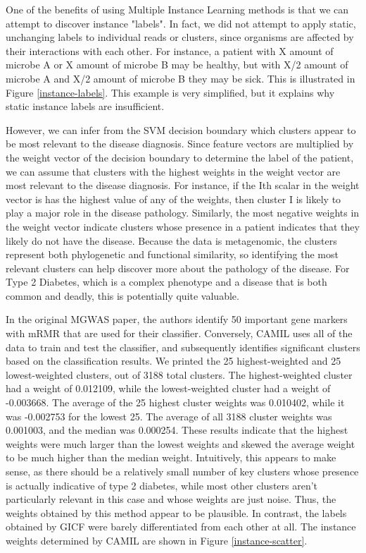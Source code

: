 One of the benefits of using Multiple Instance Learning methods is that we can attempt to discover instance "labels". In fact, we did not attempt to apply static, unchanging labels to individual reads or clusters, since organisms are affected by their interactions with each other. For instance, a patient with X amount of microbe A or X amount of microbe B may be healthy, but with X/2 amount of microbe A and X/2 amount of microbe B they may be sick. This is illustrated in Figure \ref{instance-labels}. This example is very simplified, but it explains why static instance labels are insufficient.

However, we can infer from the SVM decision boundary which clusters appear to be most relevant to the disease diagnosis. Since feature vectors are multiplied by the weight vector of the decision boundary to determine the label of the patient, we can assume that clusters with the highest weights in the weight vector are most relevant to the disease diagnosis. For instance, if the Ith scalar in the weight vector is has the highest value of any of the weights, then cluster I is likely to play a major role in the disease pathology. Similarly, the most negative weights in the weight vector indicate clusters whose presence in a patient indicates that they likely do not have the disease. Because the data is metagenomic, the clusters represent both phylogenetic and functional similarity, so identifying the most relevant clusters can help discover more about the pathology of the disease. For Type 2 Diabetes, which is a complex phenotype and a disease that is both common and deadly, this is potentially quite valuable.

In the original MGWAS paper, the authors identify 50 important gene markers with mRMR that are used for their classifier. Conversely, CAMIL uses all of the data to train and test the classifier, and subsequently identifies significant clusters based on the classification results. We printed the 25 highest-weighted and 25 lowest-weighted clusters, out of 3188 total clusters. The highest-weighted cluster had a weight of 0.012109, while the lowest-weighted cluster had a weight of -0.003668. The average of the 25 highest cluster weights was 0.010402, while it was -0.002753 for the lowest 25. The average of all 3188 cluster weights was 0.001003, and the median was 0.000254. These results indicate that the highest weights were much larger than the lowest weights and skewed the average weight to be much higher than the median weight. Intuitively, this appears to make sense, as there should be a relatively small number of key clusters whose presence is actually indicative of type 2 diabetes, while most other clusters aren't particularly relevant in this case and whose weights are just noise. Thus, the weights obtained by this method appear to be plausible. In contrast, the labels obtained by GICF were barely differentiated from each other at all. The instance weights determined by CAMIL are shown in Figure \ref{instance-scatter}.